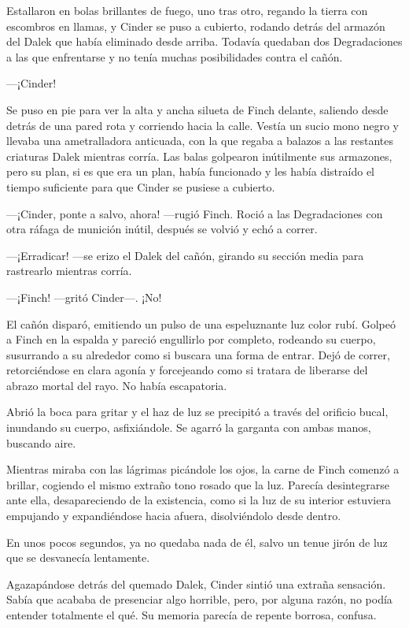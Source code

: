 Estallaron en bolas brillantes de fuego, uno tras otro, regando la tierra con escombros en llamas, y Cinder se puso a cubierto, rodando detrás del armazón del Dalek que había eliminado desde arriba. Todavía quedaban dos Degradaciones a las que enfrentarse y no tenía muchas posibilidades contra el cañón. 



—¡Cinder! 



Se puso en pie para ver la alta y ancha silueta de Finch delante, saliendo desde detrás de una pared rota y corriendo hacia la calle. Vestía un sucio mono negro y llevaba una ametralladora anticuada, con la que regaba a balazos a las restantes criaturas Dalek mientras corría. Las balas golpearon inútilmente sus armazones, pero su plan, si es que era un plan, había funcionado y les había distraído el tiempo suficiente para que Cinder se pusiese a cubierto. 



—¡Cinder, ponte a salvo, ahora! —rugió Finch. Roció a las Degradaciones con otra ráfaga de munición inútil, después se volvió y echó a correr. 

—¡Erradicar! —se erizo el Dalek del cañón, girando su sección media para rastrearlo mientras corría. 

—¡Finch! —gritó Cinder—. ¡No!

 

El cañón disparó, emitiendo un pulso de una espeluznante luz color rubí. Golpeó a Finch en la espalda y pareció engullirlo por completo, rodeando su cuerpo, susurrando a su alrededor como si buscara una forma de entrar. Dejó de correr, retorciéndose en clara agonía y forcejeando como si tratara de liberarse del abrazo mortal del rayo. No había escapatoria. 

Abrió la boca para gritar y el haz de luz se precipitó a través del orificio bucal, inundando su cuerpo, asfixiándole. Se agarró la garganta con ambas manos, buscando aire. 

Mientras miraba con las lágrimas picándole los ojos, la carne de Finch comenzó a brillar, cogiendo el mismo extraño tono rosado que la luz. Parecía desintegrarse ante ella, desapareciendo de la existencia, como si la luz de su interior estuviera empujando y expandiéndose hacia afuera, disolviéndolo desde dentro. 

En unos pocos segundos, ya no quedaba nada de él, salvo un tenue jirón de luz que se desvanecía lentamente. 

Agazapándose detrás del quemado Dalek, Cinder sintió una extraña sensación. Sabía que acababa de presenciar algo horrible, pero, por alguna razón, no podía entender totalmente el qué. Su memoria parecía de repente borrosa, confusa. 

